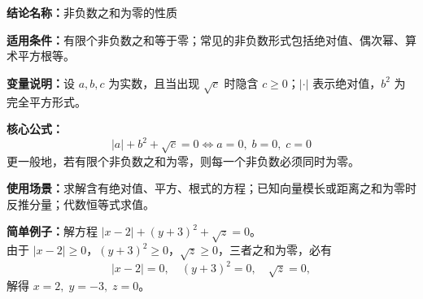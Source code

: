 \textbf{结论名称：}非负数之和为零的性质

\textbf{适用条件：}有限个非负数之和等于零；常见的非负数形式包括绝对值、偶次幂、算术平方根等。

\textbf{变量说明：}设 \(a,b,c\) 为实数，且当出现 \(\sqrt{c}\) 时隐含 \(c\ge0\)；\(|\cdot|\) 表示绝对值，\(b^{2}\) 为完全平方形式。

\textbf{核心公式：}\[
\boxed{|a|+b^{2}+\sqrt{c}=0 \iff a=0,\; b=0,\; c=0}
\]
更一般地，若有限个非负数之和为零，则每一个非负数必须同时为零。

\textbf{使用场景：}求解含有绝对值、平方、根式的方程；已知向量模长或距离之和为零时反推分量；代数恒等式求值。

\textbf{简单例子：}解方程 \(|x-2|+(y+3)^{2}+\sqrt{z}=0\)。\\
由于 \(|x-2|\ge0\)，\((y+3)^{2}\ge0\)，\(\sqrt{z}\ge0\)，三者之和为零，必有
\[
|x-2|=0,\quad (y+3)^{2}=0,\quad \sqrt{z}=0,
\]
解得 \(x=2,\; y=-3,\; z=0\)。